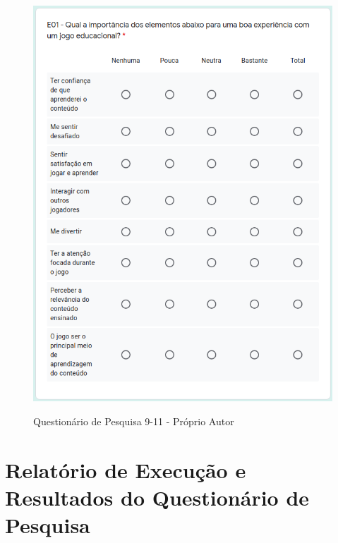 \begin{apendicesenv}
\begin{figure}[htbp]
{        \includegraphics[keepaspectratio=true,scale=1.25]{figuras/apendice/survey10.png}
        \label{Fig:survey_pt10.png}
    }
    \quad
   
	\caption{Questionário de Pesquisa 9-11 - Próprio Autor}
	\label{Fig:survey3.png}
\end{figure}

\chapter{Relatório de Execução e Resultados do Questionário de Pesquisa}
\label{ap:res_quest}


\end{apendicesenv}
